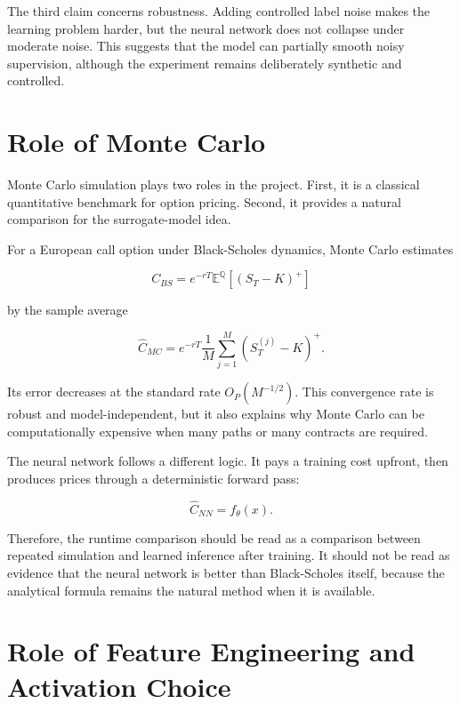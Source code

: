The third claim concerns robustness.
Adding controlled label noise makes the learning problem harder, but the neural network does not collapse under moderate noise.
This suggests that the model can partially smooth noisy supervision, although the experiment remains deliberately synthetic and controlled.

\section{Role of Monte Carlo}

Monte Carlo simulation plays two roles in the project.
First, it is a classical quantitative benchmark for option pricing.
Second, it provides a natural comparison for the surrogate-model idea.

For a European call option under Black-Scholes dynamics, Monte Carlo estimates

\begin{equation}
    C_{BS}
    =
    e^{-rT}
    \mathbb{E}^{\mathbb{Q}}\left[(S_T-K)^+\right]
\end{equation}

by the sample average

\begin{equation}
    \hat{C}_{MC}
    =
    e^{-rT}
    \frac{1}{M}
    \sum_{j=1}^{M}
    (S_T^{(j)}-K)^+.
\end{equation}

Its error decreases at the standard rate $O_P(M^{-1/2})$.
This convergence rate is robust and model-independent, but it also explains why Monte Carlo can be computationally expensive when many paths or many contracts are required.

The neural network follows a different logic.
It pays a training cost upfront, then produces prices through a deterministic forward pass:

\begin{equation}
    \hat{C}_{NN} = f_\theta(x).
\end{equation}

Therefore, the runtime comparison should be read as a comparison between repeated simulation and learned inference after training.
It should not be read as evidence that the neural network is better than Black-Scholes itself, because the analytical formula remains the natural method when it is available.

\section{Role of Feature Engineering and Activation Choice}

